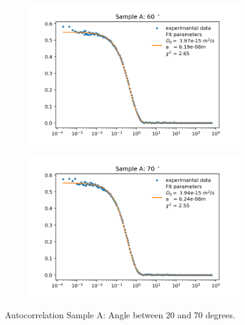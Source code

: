 \documentclass[]{article}
\begin{document}
\begin{figure}[!h]
\medskip
\begin{subfigure}{0.48\textwidth}
\includegraphics[width=\linewidth]{Plots/A/60.png}
\end{subfigure}
\begin{subfigure}[c]{0.48\linewidth}
\includegraphics[width=\linewidth]{Plots/A/70.png}
\end{subfigure}

\caption{Autocorrelation Sample A: Angle between 20 and 70 degrees.}
\end{figure}
\newpage
\end{document}
